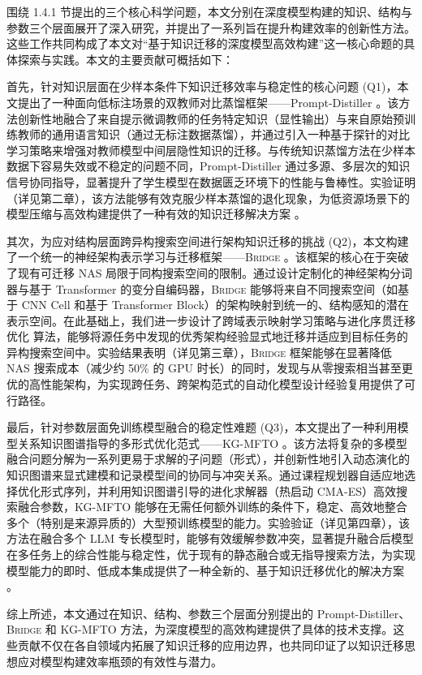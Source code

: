 \documentclass[../main.tex]{subfiles}
\begin{document}

围绕 1.4.1 节提出的三个核心科学问题，本文分别在深度模型构建的知识、结构与参数三个层面展开了深入研究，并提出了一系列旨在提升构建效率的创新性方法。这些工作共同构成了本文对“基于知识迁移的深度模型高效构建”这一核心命题的具体探索与实践。本文的主要贡献可概括如下：

首先，针对知识层面在少样本条件下知识迁移效率与稳定性的核心问题 (Q1)，本文提出了一种面向低标注场景的双教师对比蒸馏框架——Prompt-Distiller 。该方法创新性地融合了来自提示微调教师的任务特定知识（显性输出）与来自原始预训练教师的通用语言知识（通过无标注数据蒸馏），并通过引入一种基于探针的对比学习策略来增强对教师模型中间层隐性知识的迁移。与传统知识蒸馏方法在少样本数据下容易失效或不稳定的问题不同，Prompt-Distiller 通过多源、多层次的知识信号协同指导，显著提升了学生模型在数据匮乏环境下的性能与鲁棒性。实验证明（详见第二章），该方法能够有效克服少样本蒸馏的退化现象，为低资源场景下的模型压缩与高效构建提供了一种有效的知识迁移解决方案 。

其次，为应对结构层面跨异构搜索空间进行架构知识迁移的挑战 (Q2)，本文构建了一个统一的神经架构表示学习与迁移框架——\textsc{Bridge} 。该框架的核心在于突破了现有可迁移 NAS 局限于同构搜索空间的限制。通过设计定制化的神经架构分词器与基于 Transformer 的变分自编码器，\textsc{Bridge} 能够将来自不同搜索空间（如基于 CNN Cell 和基于 Transformer Block）的架构映射到统一的、结构感知的潜在表示空间。在此基础上，我们进一步设计了跨域表示映射学习策略与进化序贯迁移优化 算法，能够将源任务中发现的优秀架构经验显式地迁移并适应到目标任务的异构搜索空间中。实验结果表明（详见第三章），\textsc{Bridge} 框架能够在显著降低 NAS 搜索成本（减少约 50\% 的 GPU 时长）的同时，发现与从零搜索相当甚至更优的高性能架构，为实现跨任务、跨架构范式的自动化模型设计经验复用提供了可行路径。

最后，针对参数层面免训练模型融合的稳定性难题 (Q3)，本文提出了一种利用模型关系知识图谱指导的多形式优化范式——KG-MFTO 。该方法将复杂的多模型融合问题分解为一系列更易于求解的子问题（形式），并创新性地引入动态演化的知识图谱来显式建模和记录模型间的协同与冲突关系。通过课程规划器自适应地选择优化形式序列，并利用知识图谱引导的进化求解器（热启动 CMA-ES）高效搜索融合参数，KG-MFTO 能够在无需任何额外训练的条件下，稳定、高效地整合多个（特别是来源异质的）大型预训练模型的能力。实验验证（详见第四章），该方法在融合多个 LLM 专长模型时，能够有效缓解参数冲突，显著提升融合后模型在多任务上的综合性能与稳定性，优于现有的静态融合或无指导搜索方法，为实现模型能力的即时、低成本集成提供了一种全新的、基于知识迁移优化的解决方案 。

综上所述，本文通过在知识、结构、参数三个层面分别提出的 Prompt-Distiller、\textsc{Bridge} 和 KG-MFTO 方法，为深度模型的高效构建提供了具体的技术支撑。这些贡献不仅在各自领域内拓展了知识迁移的应用边界，也共同印证了以知识迁移思想应对模型构建效率瓶颈的有效性与潜力。
\end{document}
